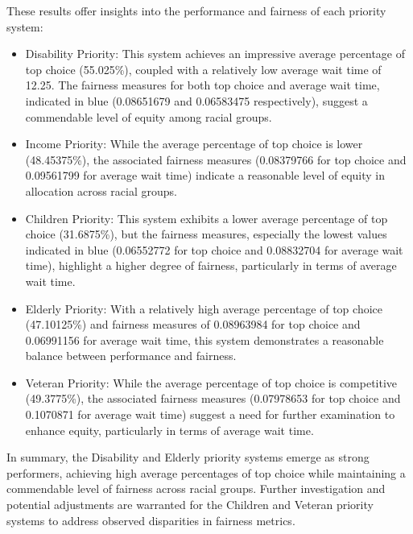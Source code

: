\documentclass[11pt]{article}
\begin{document}
\newline
These results offer insights into the performance and fairness of each priority system:
\begin{itemize}
    \item Disability Priority: This system achieves an impressive average percentage of top choice ({55.025\%}), coupled with a relatively low average wait time of 12.25. The fairness measures for both top choice and average wait time, indicated in blue ({0.08651679} and {0.06583475} respectively), suggest a commendable level of equity among racial groups.
    \item Income Priority: While the average percentage of top choice is lower (48.45375\%), the associated fairness measures (0.08379766 for top choice and 0.09561799 for average wait time) indicate a reasonable level of equity in allocation across racial groups.
    \item Children Priority: This system exhibits a lower average percentage of top choice (31.6875\%), but the fairness measures, especially the lowest values indicated in blue ({0.06552772} for top choice and 0.08832704 for average wait time), highlight a higher degree of fairness, particularly in terms of average wait time.
    \item Elderly Priority: With a relatively high average percentage of top choice (47.10125\%) and fairness measures of 0.08963984 for top choice and 0.06991156 for average wait time, this system demonstrates a reasonable balance between performance and fairness.
    \item Veteran Priority: While the average percentage of top choice is competitive (49.3775\%), the associated fairness measures (0.07978653 for top choice and 0.1070871 for average wait time) suggest a need for further examination to enhance equity, particularly in terms of average wait time.
\end{itemize}
\newline
In summary, the Disability and Elderly priority systems emerge as strong performers, achieving high average percentages of top choice while maintaining a commendable level of fairness across racial groups. Further investigation and potential adjustments are warranted for the Children and Veteran priority systems to address observed disparities in fairness metrics.
\end{document}
